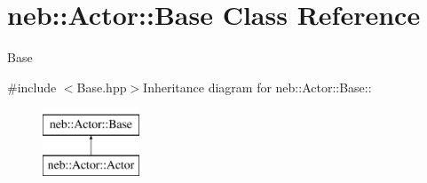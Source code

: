 \hypertarget{classneb_1_1Actor_1_1Base}{
\section{neb::Actor::Base Class Reference}
\label{classneb_1_1Actor_1_1Base}
}


Base  


{\ttfamily \#include $<$Base.hpp$>$}Inheritance diagram for neb::Actor::Base::\begin{figure}[H]
\begin{center}
\leavevmode
\includegraphics[height=2cm]{classneb_1_1Actor_1_1Base}
\end{center}
\end{figure}

